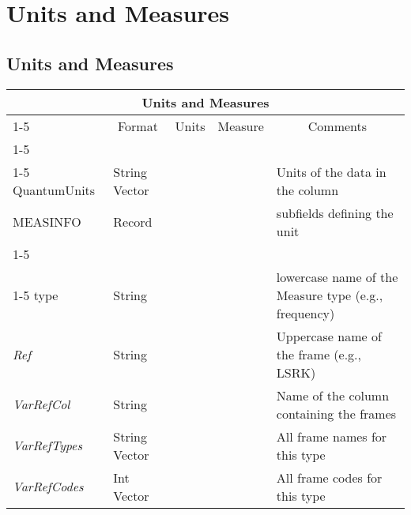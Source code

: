 \documentclass{article}
\newcommand{\defline}[1]{\cline{1-5}
\multicolumn{5}{|l|}{#1} \\
\cline{1-5}}
\newcommand{\definetable}[2]
{
	\vfill\newpage
	\subsection{#1}
        \vspace{0.15in}
        \small
	\begin{tabular}{|l|p{1.25in}|l|p{.9in}|p{1.4in}|}
	\hline
	\multicolumn{5}{|c|}{\bf #1}\\ 
	\cline{1-5}
        \multicolumn{1}{|c|}{Name}&\multicolumn{1}{|c|}{Format}&
        \multicolumn{1}{|c|}{Units}&\multicolumn{1}{|c|}{Measure}&
        \multicolumn{1}{|c|}{Comments}\\
        \cline{1-5}
        #2
        \hline
	\end{tabular}
}
\begin{document}
\section{Units and Measures}

\definetable{Units and Measures}{
\defline{\bf Column keywords}
QuantumUnits &        String Vector &    &      & Units of the data in the column\\
MEASINFO &  Record  &     &   & subfields defining the unit\\
\defline{\em Subfields of MEASINFO}  
type &        String    &      &      & lowercase name of the Measure type (e.g., frequency)\\
{\it Ref} & String &     &      & Uppercase name of the frame (e.g., LSRK)\\
{\it VarRefCol} & String &     &      & Name of the column containing the frames\\
{\it VarRefTypes} & String Vector&     &      & All frame names for this type\\
{\it VarRefCodes} & Int Vector&     &      & All frame codes for this type\\
}
\end{document}
